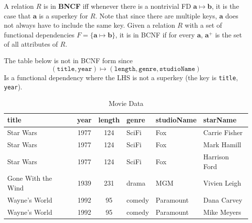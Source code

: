 \documentclass{article}
\begin{document}
    \begin{definition}[BNCF]
      A relation $R$ is in \textbf{BNCF} iff whenever there is a nontrivial FD $\mathbf{a} \mapsto \mathbf{b}$, it is the case that $\mathbf{a}$ is a superkey for $R$. Note that since there are multiple keys, $\mathbf{a}$ does not always have to include the same key. Given a relation $R$ with a set of functional dependencies $F = \{\mathbf{a} \mapsto \mathbf{b}\}$, it is in BCNF if for every $\mathbf{a}$, $\mathbf{a}^+$ is the set of all attributes of $R$. 
    \end{definition}

    \begin{example}
      The table below is not in BCNF form since 
      \begin{equation}
        (\texttt{title}, \texttt{year}) \mapsto (\texttt{length}, \texttt{genre}, \texttt{studioName}) 
      \end{equation}
      Is a functional dependency where the LHS is not a superkey (the key is \texttt{title}, \texttt{year}). 
      \begin{table}[H]
        \centering
        \begin{tabular}{|l|c|c|l|l|l|}
        \hline
        \textbf{title} & \textbf{year} & \textbf{length} & \textbf{genre} & \textbf{studioName} & \textbf{starName} \\
        \hline
        Star Wars & 1977 & 124 & SciFi & Fox & Carrie Fisher \\
        Star Wars & 1977 & 124 & SciFi & Fox & Mark Hamill \\
        Star Wars & 1977 & 124 & SciFi & Fox & Harrison Ford \\
        Gone With the Wind & 1939 & 231 & drama & MGM & Vivien Leigh \\
        Wayne's World & 1992 & 95 & comedy & Paramount & Dana Carvey \\
        Wayne's World & 1992 & 95 & comedy & Paramount & Mike Meyers \\
        \hline
        \end{tabular}
        \caption{Movie Data}
        \label{tab:moviedata}
      \end{table} 
    \end{example}
\end{document}
